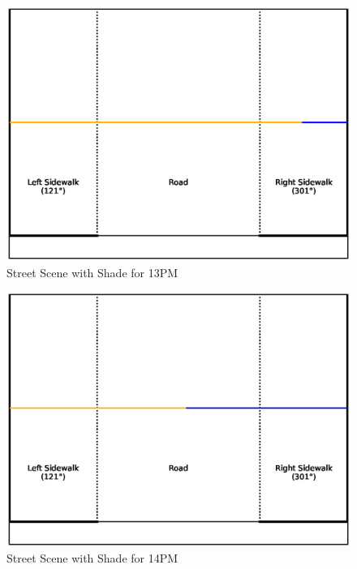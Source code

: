 \documentclass[nohyperref]{article}
\theoremstyle{plain}
\theoremstyle{definition}
\theoremstyle{remark}
\begin{document}
\begin{figure}[ht]
\begin{center}
\centerline{\includegraphics[width=\columnwidth]{sidewalk_predictions/shade_at_13}}
\caption{Street Scene with Shade for 13PM}
\end{center}
\end{figure}

\begin{figure}[ht]
\begin{center}
\centerline{\includegraphics[width=\columnwidth]{sidewalk_predictions/shade_at_14}}
\caption{Street Scene with Shade for 14PM}
\end{center}
\end{figure}
\end{document}
